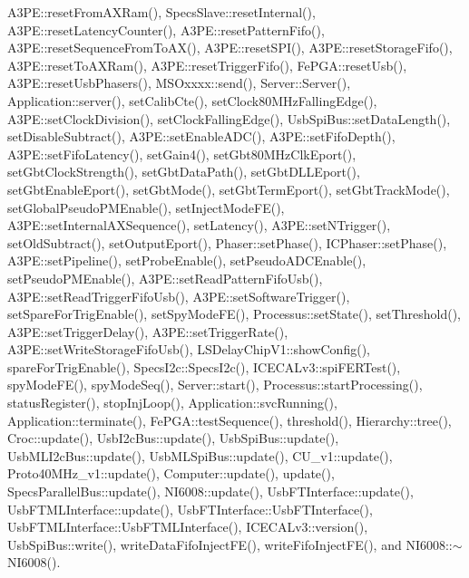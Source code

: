 A3\+P\+E\+::reset\+From\+A\+X\+Ram(), Specs\+Slave\+::reset\+Internal(), A3\+P\+E\+::reset\+Latency\+Counter(), A3\+P\+E\+::reset\+Pattern\+Fifo(), A3\+P\+E\+::reset\+Sequence\+From\+To\+A\+X(), A3\+P\+E\+::reset\+S\+P\+I(), A3\+P\+E\+::reset\+Storage\+Fifo(), A3\+P\+E\+::reset\+To\+A\+X\+Ram(), A3\+P\+E\+::reset\+Trigger\+Fifo(), Fe\+P\+G\+A\+::reset\+Usb(), A3\+P\+E\+::reset\+Usb\+Phasers(), M\+S\+Oxxxx\+::send(), Server\+::\+Server(), Application\+::server(), set\+Calib\+Cte(), set\+Clock80\+M\+Hz\+Falling\+Edge(), A3\+P\+E\+::set\+Clock\+Division(), set\+Clock\+Falling\+Edge(), Usb\+Spi\+Bus\+::set\+Data\+Length(), set\+Disable\+Subtract(), A3\+P\+E\+::set\+Enable\+A\+D\+C(), A3\+P\+E\+::set\+Fifo\+Depth(), A3\+P\+E\+::set\+Fifo\+Latency(), set\+Gain4(), set\+Gbt80\+M\+Hz\+Clk\+Eport(), set\+Gbt\+Clock\+Strength(), set\+Gbt\+Data\+Path(), set\+Gbt\+D\+L\+L\+Eport(), set\+Gbt\+Enable\+Eport(), set\+Gbt\+Mode(), set\+Gbt\+Term\+Eport(), set\+Gbt\+Track\+Mode(), set\+Global\+Pseudo\+P\+M\+Enable(), set\+Inject\+Mode\+F\+E(), A3\+P\+E\+::set\+Internal\+A\+X\+Sequence(), set\+Latency(), A3\+P\+E\+::set\+N\+Trigger(), set\+Old\+Subtract(), set\+Output\+Eport(), Phaser\+::set\+Phase(), I\+C\+Phaser\+::set\+Phase(), A3\+P\+E\+::set\+Pipeline(), set\+Probe\+Enable(), set\+Pseudo\+A\+D\+C\+Enable(), set\+Pseudo\+P\+M\+Enable(), A3\+P\+E\+::set\+Read\+Pattern\+Fifo\+Usb(), A3\+P\+E\+::set\+Read\+Trigger\+Fifo\+Usb(), A3\+P\+E\+::set\+Software\+Trigger(), set\+Spare\+For\+Trig\+Enable(), set\+Spy\+Mode\+F\+E(), Processus\+::set\+State(), set\+Threshold(), A3\+P\+E\+::set\+Trigger\+Delay(), A3\+P\+E\+::set\+Trigger\+Rate(), A3\+P\+E\+::set\+Write\+Storage\+Fifo\+Usb(), L\+S\+Delay\+Chip\+V1\+::show\+Config(), spare\+For\+Trig\+Enable(), Specs\+I2c\+::\+Specs\+I2c(), I\+C\+E\+C\+A\+Lv3\+::spi\+F\+E\+R\+Test(), spy\+Mode\+F\+E(), spy\+Mode\+Seq(), Server\+::start(), Processus\+::start\+Processing(), status\+Register(), stop\+Inj\+Loop(), Application\+::svc\+Running(), Application\+::terminate(), Fe\+P\+G\+A\+::test\+Sequence(), threshold(), Hierarchy\+::tree(), Croc\+::update(), Usb\+I2c\+Bus\+::update(), Usb\+Spi\+Bus\+::update(), Usb\+M\+L\+I2c\+Bus\+::update(), Usb\+M\+L\+Spi\+Bus\+::update(), C\+U\+\_\+v1\+::update(), Proto40\+M\+Hz\+\_\+v1\+::update(), Computer\+::update(), update(), Specs\+Parallel\+Bus\+::update(), N\+I6008\+::update(), Usb\+F\+T\+Interface\+::update(), Usb\+F\+T\+M\+L\+Interface\+::update(), Usb\+F\+T\+Interface\+::\+Usb\+F\+T\+Interface(), Usb\+F\+T\+M\+L\+Interface\+::\+Usb\+F\+T\+M\+L\+Interface(), I\+C\+E\+C\+A\+Lv3\+::version(), Usb\+Spi\+Bus\+::write(), write\+Data\+Fifo\+Inject\+F\+E(), write\+Fifo\+Inject\+F\+E(), and N\+I6008\+::$\sim$\+N\+I6008().


